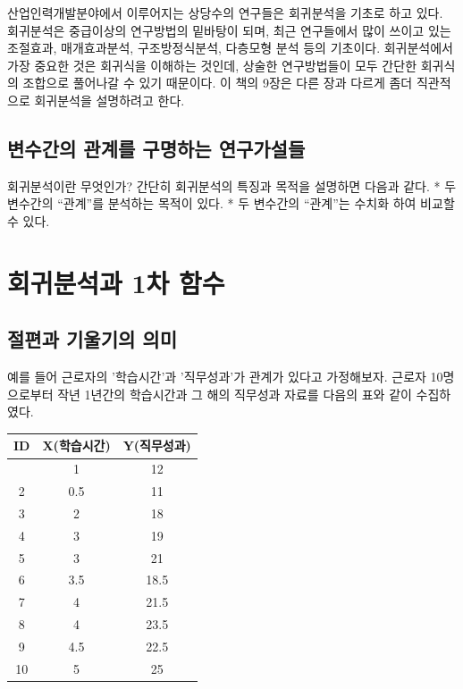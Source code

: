 \documentclass[
]{book}
\begin{document}
산업인력개발분야에서 이루어지는 상당수의 연구들은 회귀분석을 기초로 하고 있다. 회귀분석은 중급이상의 연구방법의 밑바탕이 되며, 최근 연구들에서 많이 쓰이고 있는 조절효과, 매개효과분석, 구조방정식분석, 다층모형 분석 등의 기초이다. 회귀분석에서 가장 중요한 것은 회귀식을 이해하는 것인데, 상술한 연구방법들이 모두 간단한 회귀식의 조합으로 풀어나갈 수 있기 때문이다. 이 책의 9장은 다른 장과 다르게 좀더 직관적으로 회귀분석을 설명하려고 한다.

\subsection{변수간의 관계를 구명하는 연구가설들}\label{uxbcc0uxc218uxac04uxc758-uxad00uxacc4uxb97c-uxad6cuxba85uxd558uxb294-uxc5f0uxad6cuxac00uxc124uxb4e4}

회귀분석이란 무엇인가? 간단히 회귀분석의 특징과 목적을 설명하면 다음과 같다.
* 두 변수간의 ``관계''를 분석하는 목적이 있다.
* 두 변수간의 ``관계''는 수치화 하여 비교할 수 있다.

\section{회귀분석과 1차 함수}\label{uxd68cuxadc0uxbd84uxc11duxacfc-1uxcc28-uxd568uxc218}

\subsection{절편과 기울기의 의미}\label{uxc808uxd3b8uxacfc-uxae30uxc6b8uxae30uxc758-uxc758uxbbf8}

예를 들어 근로자의 '학습시간'과 '직무성과'가 관계가 있다고 가정해보자. 근로자 10명으로부터 작년 1년간의 학습시간과 그 해의 직무성과 자료를 다음의 표와 같이 수집하였다.

\begin{longtable}[]{@{}ccc@{}}
\toprule\noalign{}
ID & X(학습시간) & Y(직무성과) \\
\midrule\noalign{}
\endhead
\bottomrule\noalign{}
\endlastfoot
1 & 1 & 12 \\
2 & 0.5 & 11 \\
3 & 2 & 18 \\
4 & 3 & 19 \\
5 & 3 & 21 \\
6 & 3.5 & 18.5 \\
7 & 4 & 21.5 \\
8 & 4 & 23.5 \\
9 & 4.5 & 22.5 \\
10 & 5 & 25 \\
\end{longtable}
\end{document}

